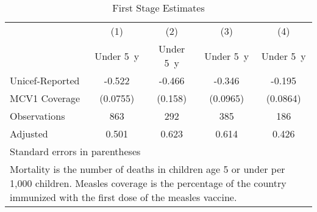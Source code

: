 \begin{table}[htbp]\centering
\caption{First Stage Estimates}
\begin{tabular}{l*{4}{c}}
\toprule
                &\multicolumn{1}{c}{(1)}&\multicolumn{1}{c}{(2)}&\multicolumn{1}{c}{(3)}&\multicolumn{1}{c}{(4)}\\
                &\multicolumn{1}{c}{Under 5~y}&\multicolumn{1}{c}{Under 5~y}&\multicolumn{1}{c}{Under 5~y}&\multicolumn{1}{c}{Under 5~y}\\
\midrule
Unicef-Reported &   -0.522&   -0.466&   -0.346&   -0.195\\
MCV1 Coverage   & (0.0755)&  (0.158)& (0.0965)& (0.0864)\\
\midrule
Observations    &      863&      292&      385&      186\\
Adjusted \(R^{~)&    0.501&    0.623&    0.614&    0.426\\
\bottomrule
\multicolumn{5}{l}{\footnotesize Standard errors in parentheses}\\
\multicolumn{5}{l}{\footnotesize Mortality is the number of deaths in children age 5 or under per 1,000 children. Measles coverage is the percentage of the country immunized with the first dose of the measles vaccine.}\\
\end{tabular}
\end{table}
